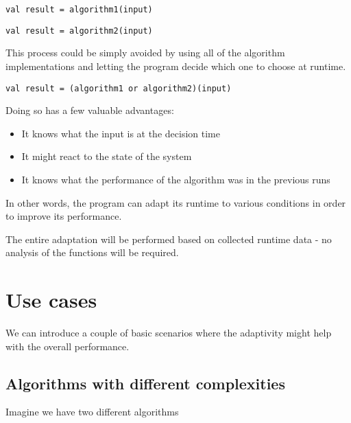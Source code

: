 \lstset{style=Scala}
\begin{lstlisting}
val result = algorithm1(input)
\end{lstlisting}

\lstset{style=Scala}
\begin{lstlisting}
val result = algorithm2(input)
\end{lstlisting}

This process could be simply avoided by using all of the algorithm implementations and letting the program decide which one to choose at runtime.

\lstset{style=Scala}
\begin{lstlisting}
val result = (algorithm1 or algorithm2)(input)
\end{lstlisting}

Doing so has a few valuable advantages:
\begin{itemize}
	\item It knows what the input is at the decision time
	\item It might react to the state of the system
	\item It knows what the performance of the algorithm was in the previous runs
\end{itemize}

In other words, the program can adapt its runtime to various conditions in order to improve its performance.

The entire adaptation will be performed based on collected runtime data - no analysis of the functions will be required.

\section{Use cases}

We can introduce a couple of basic scenarios where the adaptivity might help with the overall performance.

\subsection{Algorithms with different complexities}

Imagine we have two different algorithms 

